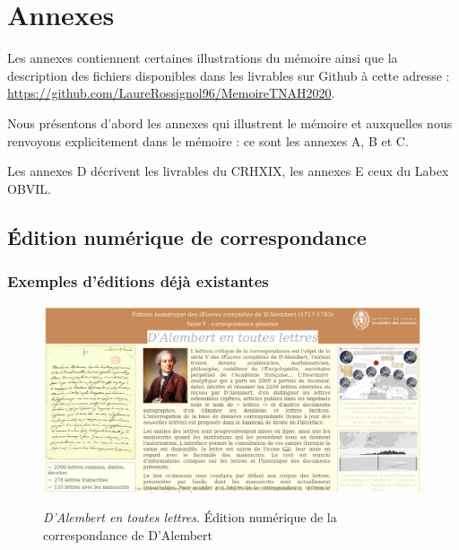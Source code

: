 \appendix
\part*{Annexes}
\pagestyle{myheadings}

Les annexes contiennent certaines illustrations du mémoire ainsi que la description des fichiers disponibles dans les livrables sur Github à cette adresse : \url{https://github.com/LaureRossignol96/MemoireTNAH2020}. 

Nous présentons d'abord les annexes qui illustrent le mémoire et auxquelles nous renvoyons explicitement dans le mémoire : ce sont les annexes A, B et C.

Les annexes D décrivent les livrables du CRHXIX, les annexes E ceux du Labex OBVIL.

\chapter{Édition numérique de correspondance}
\section{Exemples d'éditions déjà existantes}

\begin{figure}[H]
    \centering
    \caption{\emph{D'Alembert en toutes lettres}. Édition numérique de la correspondance de D'Alembert}
    \includegraphics[width=16cm]{images/D_Alembert.png}
    \label{D_Alembert}
\end{figure}

